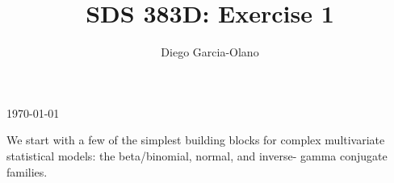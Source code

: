 \documentclass{homework}
\title{SDS 383D: Exercise 1}
\author{Diego Garcia-Olano}
\begin{document}
\makeatletter
\begin{titlepage}
	\vspace*{\fill}
	\centering
	{\huge \@title \par}
	\vskip0.5cm
	{\large \@author \par}
	\vskip0.5cm
	{\large \today \par}
	\vspace*{\fill}
\end{titlepage}
\makeatother

\newpage 
\mbox{}
\thispagestyle{empty}
\newpage

\setcounter{page}{1}


We start with a few of the simplest building blocks for complex multivariate statistical models: the beta/binomial, normal, and inverse- gamma conjugate families.
\end{document}

